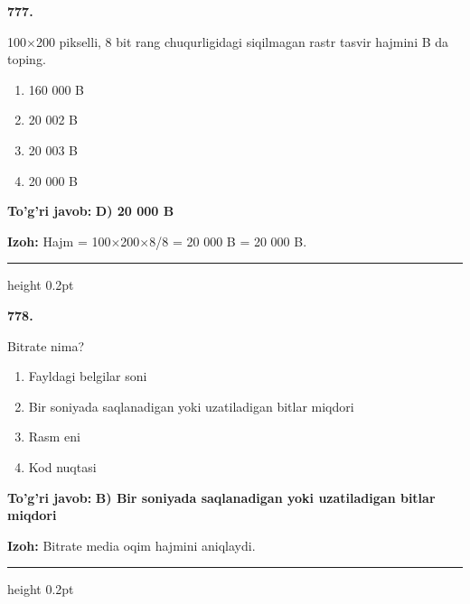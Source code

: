 \documentclass[10pt,a4paper,oneside]{article}
\begin{document}
\noindent\textbf{\color{ink}777.}
\par
100\ensuremath{\times}200 pikselli, 8 bit rang chuqurligidagi siqilmagan rastr tasvir hajmini B da toping.
\begin{enumerate}[label=\Alph*),leftmargin=9mm]
\item 160 000 B
\item 20 002 B
\item 20 003 B
\item 20 000 B
\end{enumerate}
\begin{tcolorbox}[enhanced,breakable,colback=teal!4,colframe=teal!50!black,boxrule=0.5pt,arc=1.1mm,left=3mm,right=3mm,top=1.7mm,bottom=1.7mm,before skip=2mm,after skip=2mm]
\textbf{\color{teal}To'g'ri javob:} \textbf{D) 20 000 B}
\par\smallskip
\textbf{Izoh:} Hajm = 100\ensuremath{\times}200\ensuremath{\times}8/8 = 20 000 B = 20 000 B.
\end{tcolorbox}
\vspace{2mm}\hrule height 0.2pt \vspace{3mm}

\noindent\textbf{\color{ink}778.}
\par
Bitrate nima?
\begin{enumerate}[label=\Alph*),leftmargin=9mm]
\item Fayldagi belgilar soni
\item Bir soniyada saqlanadigan yoki uzatiladigan bitlar miqdori
\item Rasm eni
\item Kod nuqtasi
\end{enumerate}
\begin{tcolorbox}[enhanced,breakable,colback=teal!4,colframe=teal!50!black,boxrule=0.5pt,arc=1.1mm,left=3mm,right=3mm,top=1.7mm,bottom=1.7mm,before skip=2mm,after skip=2mm]
\textbf{\color{teal}To'g'ri javob:} \textbf{B) Bir soniyada saqlanadigan yoki uzatiladigan bitlar miqdori}
\par\smallskip
\textbf{Izoh:} Bitrate media oqim hajmini aniqlaydi.
\end{tcolorbox}
\vspace{2mm}\hrule height 0.2pt \vspace{3mm}
\end{document}
